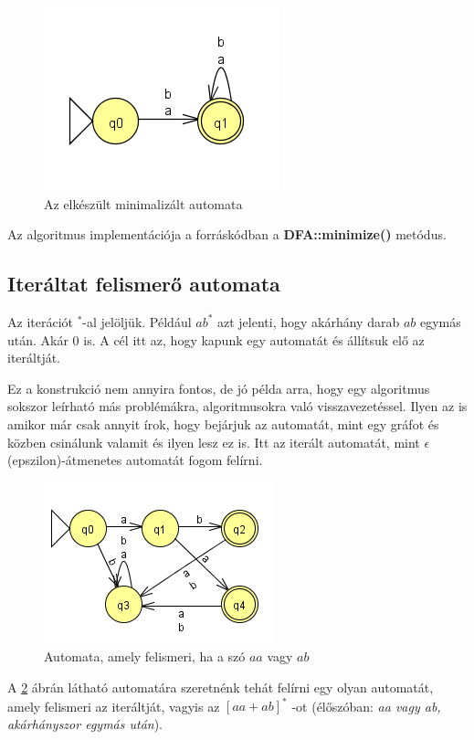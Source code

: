\documentclass[12pt]{report}
\theoremstyle{definition}
\begin{document}
\begin{figure}[H]
\centering
\includegraphics[scale=0.8]{min_minimalizalt.png}
\caption{\label{mini3} Az elkészült minimalizált automata}
\end{figure}

Az algoritmus implementációja a forráskódban a \textbf{DFA::minimize()} metódus.

\subsection{Iteráltat felismerő automata}
Az iterációt $^*$-al jelöljük. Például $ab^*$ azt jelenti, hogy akárhány darab $ab$ egymás után. Akár 0 is. A cél itt az, hogy kapunk egy automatát és állítsuk elő az iteráltját.

Ez a konstrukció nem annyira fontos, de jó példa arra, hogy egy algoritmus sokszor leírható más problémákra, algoritmusokra való visszavezetéssel. Ilyen az is amikor már csak annyit írok, hogy bejárjuk az automatát, mint egy gráfot és közben csinálunk valamit és ilyen lesz ez is. Itt az iterált automatát, mint $\epsilon$(epszilon)-átmenetes automatát fogom felírni.

\begin{figure}[H]
\centering
\includegraphics[scale=1]{iter_ab_vagy_aa.png}
\caption{\label{it1} Automata, amely felismeri, ha a szó $aa$ vagy $ab$}
\end{figure}

A \ref{it1} ábrán látható automatára szeretnénk tehát felírni egy olyan automatát, amely felismeri az iteráltját, vagyis az $[aa+ab]^*$ -ot (élőszóban: \textit{aa vagy ab, akárhányszor egymás után}).
\end{document}
